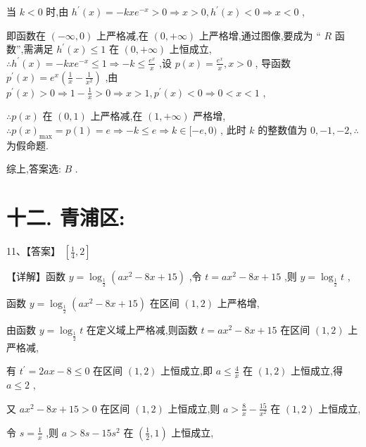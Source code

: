 \documentclass[10pt]{article}
\newcommand*\circled[1]{\tikz[baseline=(char.base)]{\node[shape=circle,draw,inner sep=1.5pt] (char) {\small #1};}}
\begin{document}
当 \(k < 0\) 时,由 \({h}^{\prime }\left( x\right)  =  - {kx}{e}^{-x} > 0 \Rightarrow  x > 0,{h}^{\prime }\left( x\right)  < 0 \Rightarrow  x < 0\) ,

即函数在 \(\left( {-\infty ,0}\right)\) 上严格减,在 \(\left( {0, + \infty }\right)\) 上严格增,通过图像,要成为 “ \(R\) 函数”,需满足 \({h}^{\prime }\left( x\right)  \leq  1\) 在 \(\left( {0, + \infty }\right)\) 上恒成立, \(\therefore {h}^{\prime }\left( x\right)  =  - {kx}{e}^{-x} \leq  1 \Rightarrow   - k \leq  \frac{{e}^{x}}{x}\) ,设 \(p\left( x\right)  = \frac{{e}^{x}}{x},x > 0\) , 导函数 \({p}^{\prime }\left( x\right)  = {e}^{x}\left( {\frac{1}{x} - \frac{1}{{x}^{2}}}\right)\) ,由 \({p}^{\prime }\left( x\right)  > 0 \Rightarrow  1 - \frac{1}{x} > 0 \Rightarrow  x > 1,{p}^{\prime }\left( x\right)  < 0 \Rightarrow  0 < x < 1\) ,

\(\therefore p\left( x\right)\) 在 \(\left( {0,1}\right)\) 上严格减,在 \(\left( {1, + \infty }\right)\) 严格增, \(\therefore p{\left( x\right) }_{\max } = p\left( 1\right)  = e \Rightarrow   - k \leq  e \Rightarrow  k \in  \lbrack  - e,0)\) , 此时 \(k\) 的整数值为 \(0, - 1, - 2,\therefore\)  \circled{2} 为假命题.

综上,答案选: \(B\) .

\section*{十二. 青浦区:}

11、【答案】 \(\left\lbrack  {\frac{1}{4},2}\right\rbrack\)

【详解】函数 \(y = {\log }_{\frac{1}{2}}\left( {a{x}^{2} - {8x} + {15}}\right)\) ,令 \(t = a{x}^{2} - {8x} + {15}\) ,则 \(y = {\log }_{\frac{1}{2}}t\) ,

函数 \(y = {\log }_{\frac{1}{2}}\left( {a{x}^{2} - {8x} + {15}}\right)\) 在区间 \(\left( {1,2}\right)\) 上严格增,

由函数 \(y = {\log }_{\frac{1}{2}}t\) 在定义域上严格减,则函数 \(t = a{x}^{2} - {8x} + {15}\) 在区间 \(\left( {1,2}\right)\) 上严格减,

有 \({t}^{\prime } = {2ax} - 8 \leq  0\) 在区间 \(\left( {1,2}\right)\) 上恒成立,即 \(a \leq  \frac{4}{x}\) 在 \(\left( {1,2}\right)\) 上恒成立,得 \(a \leq  2\) ,

又 \(a{x}^{2} - {8x} + {15} > 0\) 在区间 \(\left( {1,2}\right)\) 上恒成立,则 \(a > \frac{8}{x} - \frac{15}{{x}^{2}}\) 在 \(\left( {1,2}\right)\) 上恒成立,

令 \(s = \frac{1}{x}\) ,则 \(a > {8s} - {15}{s}^{2}\) 在 \(\left( {\frac{1}{2},1}\right)\) 上恒成立,
\end{document}
